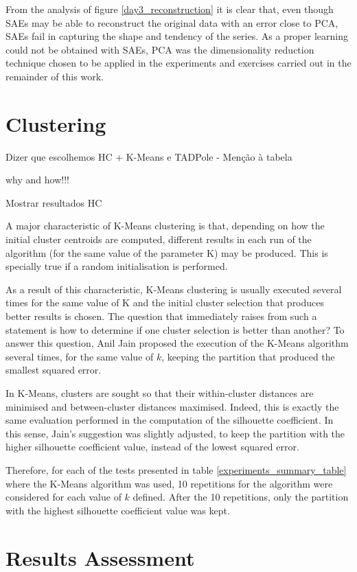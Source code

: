 \documentclass[9pt,journal,compsoc]{IEEEtran}
\begin{document}
From the analysis of figure \ref{day3_reconstruction} it is clear that, even though SAEs may be able to reconstruct the original data with an error close to PCA, SAEs fail in capturing the shape and tendency of the series. As a proper learning could not be obtained with SAEs, PCA was the dimensionality reduction technique chosen to be applied in the experiments and exercises carried out in the remainder of this work.

\section{Clustering}

Dizer que escolhemos HC + K-Means e TADPole - Menção à tabela

why and how!!!

Mostrar resultados HC

A major characteristic of K-Means clustering is that, depending on how the initial cluster centroids are computed, different results in each run of the algorithm (for the same value of the parameter K) may be produced. This is specially true if a random initialisation is performed.

As a result of this characteristic, K-Means clustering is usually executed several times for the same value of K and the initial cluster selection that produces better results is chosen. The question that immediately raises from such a statement is how to determine if one cluster selection is better than another? To answer this question, Anil Jain \cite{jain2009data} proposed the execution of the K-Means algorithm several times, for the same value of $k$, keeping the partition that produced the smallest squared error.

In K-Means, clusters are sought so that their within-cluster distances are minimised and between-cluster distances maximised. Indeed, this is exactly the same evaluation performed in the computation of the silhouette coefficient. In this sense, Jain's suggestion was slightly adjusted, to keep the partition with the higher silhouette coefficient value, instead of the lowest squared error.

Therefore, for each of the tests presented in table \ref{experiments_summary_table} where the K-Means algorithm was used, 10 repetitions for the algorithm were considered for each value of $k$ defined. After the 10 repetitions, only the partition with the highest silhouette coefficient value was kept.


\section{Results Assessment}
\label{results_assessment}
\end{document}
